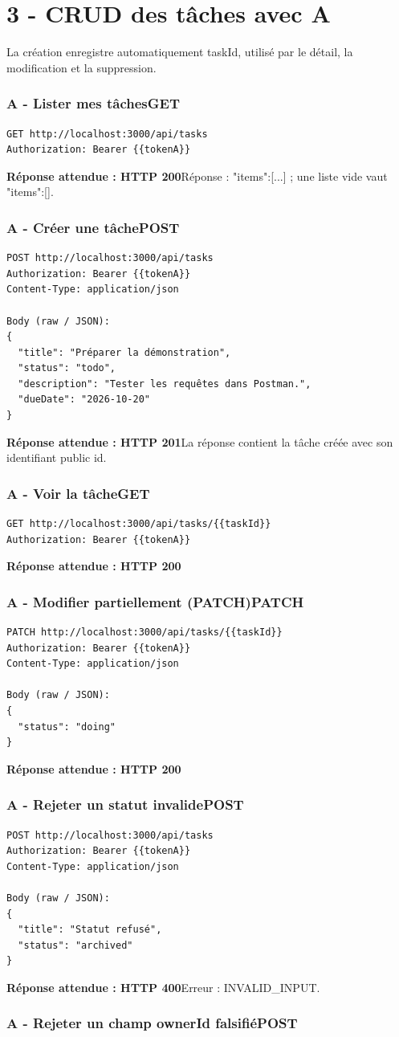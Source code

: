 \documentclass[10pt,a4paper]{article}
\newcommand{\expected}[2]{\par\smallskip\noindent\colorbox{forest!9}{\parbox{\dimexpr\linewidth-2\fboxsep}{\textcolor{forest}{\textbf{Réponse attendue : HTTP #1}}\hspace{0.4em}#2}}\par\medskip}
\newcommand{\reqheading}[3]{\subsubsection*{\textcolor{forest}{#1}\hfill\textcolor{ink}{\small #2}}\textit{#3}\par}
\begin{document}
\section{3 - CRUD des tâches avec A}
La création enregistre automatiquement taskId, utilisé par le détail, la modification et la suppression.
\reqheading{A - Lister mes tâches}{GET}{}
\begin{lstlisting}[style=requestcode]
GET http://localhost:3000/api/tasks
Authorization: Bearer {{tokenA}}
\end{lstlisting}
\expected{200}{Réponse : {"items":[...]} ; une liste vide vaut {"items":[]}.}
\vspace{0.25em}
\reqheading{A - Créer une tâche}{POST}{}
\begin{lstlisting}[style=requestcode]
POST http://localhost:3000/api/tasks
Authorization: Bearer {{tokenA}}
Content-Type: application/json

Body (raw / JSON):
{
  "title": "Préparer la démonstration",
  "status": "todo",
  "description": "Tester les requêtes dans Postman.",
  "dueDate": "2026-10-20"
}
\end{lstlisting}
\expected{201}{La réponse contient la tâche créée avec son identifiant public id.}
\vspace{0.25em}
\reqheading{A - Voir la tâche}{GET}{}
\begin{lstlisting}[style=requestcode]
GET http://localhost:3000/api/tasks/{{taskId}}
Authorization: Bearer {{tokenA}}
\end{lstlisting}
\expected{200}{}
\vspace{0.25em}
\reqheading{A - Modifier partiellement (PATCH)}{PATCH}{}
\begin{lstlisting}[style=requestcode]
PATCH http://localhost:3000/api/tasks/{{taskId}}
Authorization: Bearer {{tokenA}}
Content-Type: application/json

Body (raw / JSON):
{
  "status": "doing"
}
\end{lstlisting}
\expected{200}{}
\vspace{0.25em}
\reqheading{A - Rejeter un statut invalide}{POST}{}
\begin{lstlisting}[style=requestcode]
POST http://localhost:3000/api/tasks
Authorization: Bearer {{tokenA}}
Content-Type: application/json

Body (raw / JSON):
{
  "title": "Statut refusé",
  "status": "archived"
}
\end{lstlisting}
\expected{400}{Erreur : INVALID\_INPUT.}
\vspace{0.25em}
\reqheading{A - Rejeter un champ ownerId falsifié}{POST}{}
\end{document}
